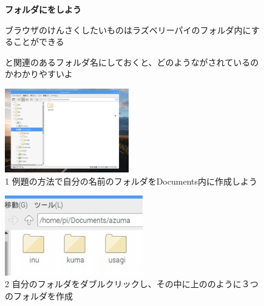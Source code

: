 \documentclass[a4paper,12pt]{jarticle}
\begin{document}
\begin{figure}[t]
  \flushleft
  {\bfseries
    フォルダにをしよう}

  ブラウザのけんさくしたいものはラズベリーパイのフォルダ内にすることができる

  と関連のあるフォルダ名にしておくと、どのようながされているのかわかりやすいよ



  \begin{minipage}{\textwidth}
    \begin{minipage}{6.582cm}
      \includegraphics[width=5.401cm]{textbook-img093.png}\\
      1 例題の方法で自分の名前のフォルダをDocuments内に作成しよう
    \end{minipage}
    \begin{minipage}{3.582cm}
    \end{minipage}
    \begin{minipage}{6.582cm}
      \includegraphics[width=5.995cm]{textbook-img094.jpg}\\
      2 自分のフォルダをダブルクリックし、その中に上ののように３つのフォルダを作成
    \end{minipage}
  \end{minipage}



\end{figure}
\end{document}
